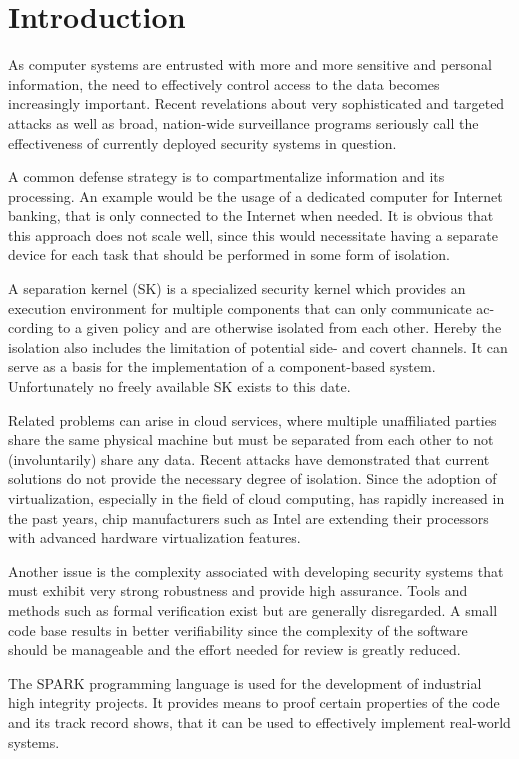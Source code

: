 \chapter{Introduction}
As computer systems are entrusted with more and more sensitive and personal
information, the need to effectively control access to the data becomes
increasingly important. Recent revelations about very sophisticated and
targeted attacks as well as broad, nation-wide surveillance programs seriously
call the effectiveness of currently deployed security systems in question.

A common defense strategy is to compartmentalize information and its processing.
An example would be the usage of a dedicated computer for Internet banking, that
is only connected to the Internet when needed. It is obvious that this approach
does not scale well, since this would necessitate having a separate device for
each task that should be performed in some form of isolation.

A separation kernel (SK) is a specialized security kernel which provides an
execution environment for multiple components that can only communicate ac-
cording to a given policy and are otherwise isolated from each other. Hereby
the isolation also includes the limitation of potential side- and covert channels.
It can serve as a basis for the implementation of a component-based system.
Unfortunately no freely available SK exists to this date.

Related problems can arise in cloud services, where multiple unaffiliated parties
share the same physical machine but must be separated from each other to not
(involuntarily) share any data. Recent attacks
\cite{Wu:2012:WHH:2362793.2362802} have demonstrated that current solutions do
not provide the necessary degree of isolation. Since the adoption of
virtualization, especially in the field of cloud computing, has rapidly
increased in the past years, chip manufacturers such as Intel are extending
their processors with advanced hardware virtualization features.

Another issue is the complexity associated with developing security systems
that must exhibit very strong robustness and provide high assurance. Tools and
methods such as formal verification exist but are generally disregarded. A
small code base results in better verifiability since the complexity of the
software should be manageable and the effort needed for review is greatly
reduced.

The SPARK programming language is used for the development of industrial high
integrity projects. It provides means to proof certain properties of the code
and its track record \cite{Chapman:2000:IES:369264.369270} shows, that it can
be used to effectively implement real-world systems.

